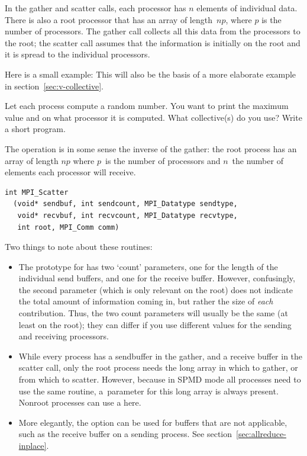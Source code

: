 In the gather and scatter calls, each processor has $n$ elements of individual
data. There is also a root processor that has an array of length~$np$, where $p$
is the number of processors. The gather call collects all this data from the 
processors to the root; the scatter call assumes that the information is 
initially on the root and it is spread to the individual processors.

Here is a small example:
This will also be the basis of a more elaborate example in
section~\ref{sec:v-collective}.

\begin{exercise}
  \label{ex:randomwhere}
  Let each process compute a random number.
  You want to print the maximum value and on what processor it
  is computed. What collective(s) do you use? Write a short program.
\end{exercise}

The  operation is in some sense the inverse of the gather:
the root process has an array of length $np$ where $p$~is the number of processors
and $n$~the number of elements each processor will receive.
\begin{lstlisting}
int MPI_Scatter
  (void* sendbuf, int sendcount, MPI_Datatype sendtype, 
   void* recvbuf, int recvcount, MPI_Datatype recvtype, 
   int root, MPI_Comm comm) 
\end{lstlisting}

Two things to note about these routines:
\begin{itemize}
\item The prototype for  has two `count' parameters, one
  for the length of the individual send buffers, and one for the receive buffer.
  However, confusingly, the second parameter (which is only relevant on the root)
  does not indicate the total amount of information coming in, but
  rather the size of \emph{each} contribution. Thus, the two count parameters
  will usually be the same (at least on the root); they can differ if you 
  use different  values for the sending and receiving
  processors.
\item While every process has a sendbuffer in the gather, and a receive buffer
  in the scatter call, only the root process needs the long array in which to gather,
  or from which to scatter.
  However, because in \ac{SPMD} mode all processes need to use the same routine,
  a~parameter for this long array is always present. Nonroot processes can use
  a  here.
\item More elegantly, the  option can be
  used for buffers that are not applicable, such as the receive buffer on a sending process.
  See section~\ref{sec:allreduce-inplace}.
\end{itemize}

